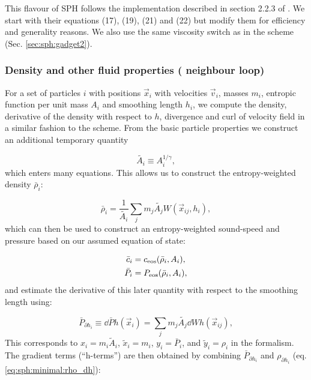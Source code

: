 This flavour of SPH follows the implementation described in section
2.2.3 of \cite{Hopkins2013}. We start with their equations (17), (19),
(21) and (22) but modify them for efficiency and generality
reasons. We also use the same \cite{Balsara1995} viscosity switch as
in the \GadgetSPH scheme (Sec. \ref{sec:sph:gadget2}).

\subsubsection{Density and other fluid properties ( neighbour loop)}

For a set of particles $i$ with positions $\vec{x}_i$ with velocities
$\vec{v}_i$, masses $m_i$, entropic function per unit mass $A_i$ and
smoothing length $h_i$, we compute the density, derivative of the
density with respect to $h$, divergence and curl of velocity field in
a similar fashion to the \GadgetSPH scheme. From the basic particle
properties we construct an additional temporary quantity

\begin{equation}
  \tilde{A_i} \equiv A_i^{1/\gamma},
    \label{eq:sph:pe:A_tilde}
\end{equation}
which enters many equations. This allows us to construct the
entropy-weighted density $\bar\rho_i$:

\begin{equation}
  \bar\rho_i = \frac{1}{\tilde{A_i}} \sum_j m_j \tilde{A_j} W(\vec{x}_{ij}, h_i),
  \label{eq:sph:pe:rho_bar}
\end{equation}
which can then be used to construct an entropy-weighted sound-speed
and pressure based on our assumed equation of state:

\begin{align}
  \bar c_i &= c_{\rm eos}(\bar\rho_i, A_i), \label{eq:sph:pe:c_bar}\\
  \bar P_i &= P_{\rm eos}(\bar\rho_i, A_i), \label{eq:sph:pe:P_bar}
\end{align}
and estimate the derivative of this later quantity with respect to the
smoothing length using:

\begin{equation}
\bar P_{\partial h_i} \equiv \dd{\bar{P}}{h}(\vec{x}_i) = \sum_j m_j
\tilde{A_j} \dd{W}{h}(\vec{x}_{ij}), \label{eq:sph:pe:P_dh}
\end{equation}
This corresponds to $x_i = m_i \tilde{A}_i$, $\tilde{x}_i = m_i$, $y_i =
\bar{P}_i$, and $\tilde{y}_i = \rho_i$ in the \citet{hopkins2013} formalism.
The gradient terms (``h-terms'') are then obtained by combining $\bar
P_{\partial h_i}$ and $\rho_{\partial h_i}$ (eq. \ref{eq:sph:minimal:rho_dh}):

